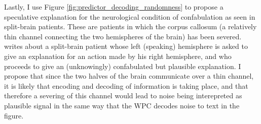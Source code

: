 Lastly, I use Figure \ref{fig:predictor_decoding_randomness} to propose a speculative explanation for the neurological condition of confabulation as seen in split-brain patients. These are patients in which the corpus callosum (a relatively thin channel connecting the two hemispheres of the brain) has been severed. \textcite{gazzaniga1967split} writes about a split-brain patient whose left (speaking) hemisphere is asked to give an explanation for an action made by his right hemisphere, and who proceeds to give an (unknowingly) confabulated but plausible explanation. I propose that since the two halves of the brain communicate over a thin channel, it is likely that encoding and decoding of information is taking place, and that therefore a severing of this channel would lead to noise being interepreted as plausible signal in the same way that the WPC decodes noise to text in the figure.